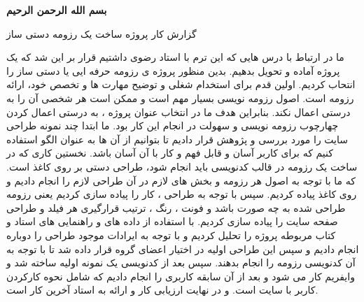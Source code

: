 \documentclass{article}
\begin{document}
	\textbf{	بسم الله الرحمن الرحیم}
	

	گزارش کار پروژه ساخت یک رزومه دستی ساز
	
	ما در ارتباط با درس هایی که این ترم با استاد رضوی داشتیم قرار بر این شد که یک پروژه آماده و تحویل بدهیم. بدین منظور پروژه ی رزومه حرفه ایی یا دستی ساز را انتحاب کردیم.
	اولین قدم برای استخدام شغلی و توضیح مهارت ها و تخصص خود، ارائه رزومه است. اصول رزومه نویسی بسیار مهم است و ممکن است هر شخصی آن را به درستی اعمال نکند. بنابراین هدف ما در انتخاب عنوان پروژه ، به درستی اعمال کردن چهارچوب رزومه نویسی و سهولت در انجام این کار بود.
	ما ابتدا چند نمونه طراحی سایت را مورد بررسی و پژوهش قرار دادیم تا بتوانیم از آن ها به عنوان الگو استفاده کنیم که برای کاربر آسان و قابل فهم و کار با آن آسان باشد.
	نخستین کاری که در ساخت یک رزومه در قالب کدنویسی باید انجام شود، طراحی دستی بر روی کاغذ است. که ما با توجه به اصول هر رزومه و بخش های لازم در آن طراحی لازم را انجام دادیم و روی کاغذ پیاده کردیم.  
	سپس با توجه به طراحی ،  کار را پیاده سازی کردیم یعنی رزومه طراحی شده به چه صورت باشد و فونت ، رنگ ، ترتیب قرارگیری هر فیلد و طراحی صفحه سایت را پیاده سازی کردیم.
	با استفاده از داده های و راهنمایی های استاد و کتاب مربوطه پروژه را تحلیل کردیم و با توجه به ایرادات موجود طراحی را دوباره انجام دادیم و سپس این طراحی اولیه در اختیار اعضای گروه قرار داده شد تا با توجه به آن کدنویسی رزومه را انجام بدهند.
	سپس بعد از کدنویسی یک نمونه اولیه ساخته شد و وایفریم کار می شود و بعد از آن سابقه کاربری را انجام دادیم که شامل نحوه کارکردن کاربر با سایت است. و در نهایت ارزیابی کار و ارائه به استاد آخرین کار است.
	
\end{document}
